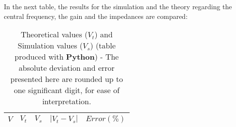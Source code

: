 In the next table, the results for the simulation and the theory regarding the central frequency, the gain and the impedances are compared:

\begin{table}[H]
  \centering
  \begin{tabular}{|c|c|c|c|c|}
    \hline
        $V$ & $V_t$ & $V_s$ & $|V_t-V_s|$ & $Error (\%)$ \\
        \hline
        \hline
        
        \hline
  \end{tabular}
  \caption{Theoretical values ($V_t$) and Simulation values ($V_s$) (table produced with {\bf Python})  - The absolute deviation and error presented here are rounded up to one significant digit, for ease of interpretation.}
  \label{error1_res}
\end{table}
